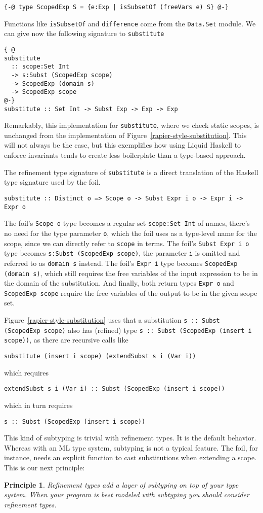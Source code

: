 \documentclass[sigconf]{acmart}
\newcommand{\tc}[1]{{\small\texttt{#1}}}
\newtheorem{principle}{Principle}
\begin{document}
\begin{verbatim}
{-@ type ScopedExp S = {e:Exp | isSubsetOf (freeVars e) S} @-}
\end{verbatim}
Functions like \tc{isSubsetOf} and \tc{difference} come from the \tc{Data.\allowbreak Set}
module. We can give now the following signature to \tc{substitute}
\begin{verbatim}
{-@
substitute
  :: scope:Set Int
  -> s:Subst (ScopedExp scope)
  -> ScopedExp (domain s)
  -> ScopedExp scope
@-}
substitute :: Set Int -> Subst Exp -> Exp -> Exp
\end{verbatim}
Remarkably, this implementation for \tc{substitute}, where we check static scopes,
is unchanged from the implementation of
Figure~\ref{rapier-style-substitution}. This will not always be the case, but this
exemplifies how using Liquid Haskell to enforce invariants tends to create less
boilerplate than a type-based approach.

The refinement type signature of \tc{substitute} is a direct translation of the
Haskell type signature used by the foil.
\begin{verbatim}
substitute :: Distinct o => Scope o -> Subst Expr i o -> Expr i -> Expr o
\end{verbatim}
The foil's \tc{Scope o} type becomes a
regular set \tc{scope:Set Int} of names, there's no need for the type parameter
\tc{o}, which the foil uses as a type-level name for the scope, since we can directly refer to \tc{scope} in terms. The foil's \tc{Subst Expr i o} type
becomes \tc{s:Subst (ScopedExp scope)}, the parameter \tc{i} is omitted and
referred to as \tc{domain s} instead. The foil's \tc{Expr i} type becomes
\tc{ScopedExp (domain s)}, which still requires the free variables of the input
expression to be in the domain of the substitution. And finally, both return types
\tc{Expr o} and \tc{ScopedExp scope} require the free variables of the output to
be in the given scope set.

Figure~\ref{rapier-style-substitution} uses that a substitution
\tc{s :: Subst (ScopedExp scope)}
also has (refined) type
\tc{s :: Subst (ScopedExp (insert i scope))},
as there are recursive calls like
\begin{verbatim}
substitute (insert i scope) (extendSubst s i (Var i))
\end{verbatim}
which requires
\begin{verbatim}
extendSubst s i (Var i) :: Subst (ScopedExp (insert i scope))
\end{verbatim}
which in turn requires
\begin{verbatim}
s :: Subst (ScopedExp (insert i scope))
\end{verbatim}
This kind of subtyping is trivial with refinement types. It is the default
behavior. Whereas with an ML type system, subtyping is not a typical feature. The
foil, for instance, needs an explicit function to cast substitutions when
extending a scope. This is our next principle:
\begin{principle}
  Refinement types add a layer of subtyping on top of your type system. When
  your program is best modeled with subtyping you should consider refinement
  types.
\end{principle}
\end{document}
